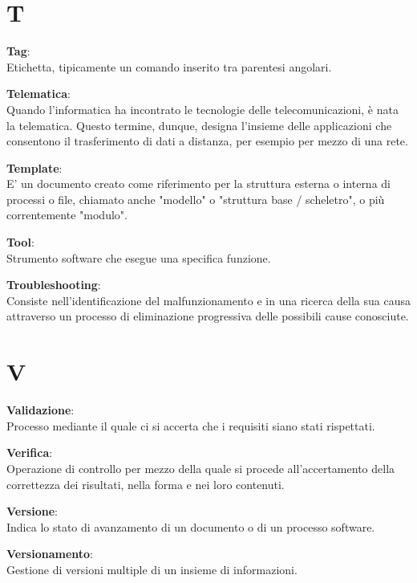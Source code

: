 \documentclass[a4paper, oneside, openany, dvipsnames, table]{article}
\begin{document}
\newpage
\section{T}
\textbf{Tag}:\\		Etichetta, tipicamente un comando inserito tra parentesi angolari.

\textbf{Telematica}:\\	 Quando l'informatica ha incontrato le tecnologie delle telecomunicazioni, è nata la telematica. Questo termine, dunque, designa l'insieme delle applicazioni che consentono il trasferimento di dati a distanza, per esempio per mezzo di una rete. 

\textbf{Template}:\\ E' un documento creato come riferimento per la struttura esterna o interna di processi o file, chiamato anche "modello" o "struttura base / scheletro", o più correntemente "modulo".

\textbf{Tool}:\\	Strumento software che esegue una specifica funzione.

\textbf{Troubleshooting}:\\	Consiste nell'identificazione del malfunzionamento e in una ricerca della sua causa attraverso un processo di eliminazione progressiva delle possibili cause conosciute.


\newpage
\section{V}
\textbf{Validazione}:\\	Processo mediante il quale ci si accerta che i requisiti siano stati rispettati.

\textbf{Verifica}:\\	Operazione di controllo per mezzo della quale si procede all'accertamento della correttezza dei risultati, nella forma e nei loro contenuti.

\textbf{Versione}:\\ Indica lo stato di avanzamento di un documento o di un processo software.

\textbf{Versionamento}:\\	Gestione di versioni multiple di un insieme di informazioni.
\end{document}
